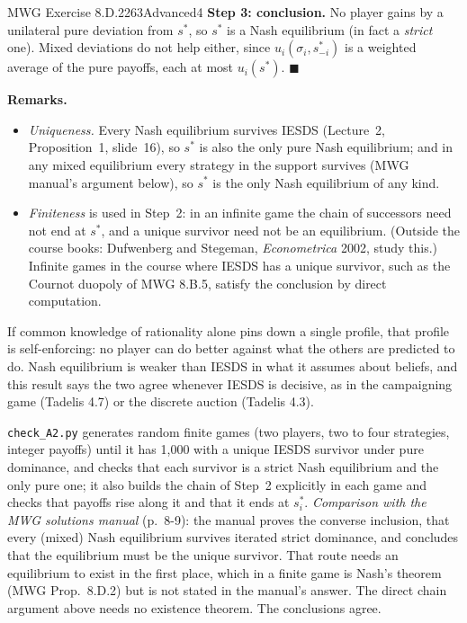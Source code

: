 \begin{exsol}{MWG Exercise 8.D.2}{263}{Advanced}{4}
\textbf{Step 3: conclusion.} No player gains by a unilateral pure deviation from $s^*$, so $s^*$ is
a Nash equilibrium (in fact a \emph{strict} one). Mixed deviations do not help either, since
$u_i(\sigma_i, s^*_{-i})$ is a weighted average of the pure payoffs, each at most
$u_i(s^*)$. $\blacksquare$

\textbf{Remarks.}
\begin{itemize}
  \item \emph{Uniqueness.} Every Nash equilibrium survives IESDS (Lecture~2, Proposition~1,
  slide~16), so $s^*$ is also the only pure Nash equilibrium; and in any mixed equilibrium every
  strategy in the support survives (MWG manual's argument below), so $s^*$ is the only Nash
  equilibrium of any kind.
  \item \emph{Finiteness} is used in Step~2: in an infinite game the chain of successors need not
  end at $s^*$, and a unique survivor need not be an equilibrium. (Outside the course books:
  Dufwenberg and Stegeman, \emph{Econometrica} 2002, study this.) Infinite games in the course where
  IESDS has a unique survivor, such as the Cournot duopoly of MWG 8.B.5, satisfy the conclusion by
  direct computation.
\end{itemize}

\interp If common knowledge of rationality alone pins down a single profile, that profile is
self-enforcing: no player can do better against what the others are predicted to do. Nash
equilibrium is weaker than IESDS in what it assumes about beliefs, and this result says the two
agree whenever IESDS is decisive, as in the campaigning game (Tadelis 4.7) or the discrete auction
(Tadelis 4.3).

\verify \texttt{check\_A2.py} generates random finite games (two players, two to four strategies,
integer payoffs) until it has 1{,}000 with a unique IESDS survivor under pure dominance, and checks
that each survivor is a strict Nash equilibrium and the only pure one; it also builds the chain of
Step~2 explicitly in each game and checks that payoffs rise along it and that it ends at $s^*_i$.
\emph{Comparison with the MWG solutions manual} (p.~8-9): the manual proves the converse
inclusion, that every (mixed) Nash equilibrium survives iterated strict dominance, and concludes
that the equilibrium must be the unique survivor. That route needs an equilibrium to exist in the
first place, which in a finite game is Nash's theorem (MWG Prop.~8.D.2) but is not stated in the
manual's answer. The direct chain argument above needs no existence theorem. The conclusions
agree.


\end{exsol}
